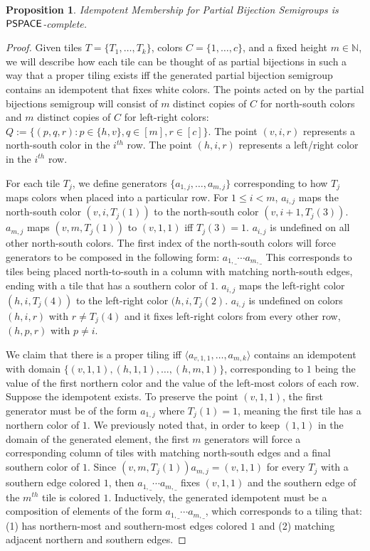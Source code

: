 \documentclass{amsart}
\newcommand{\PSPACE}{\ensuremath\mathsf{PSPACE}}
\newtheorem{proposition}[theorem]{Proposition}
\theoremstyle{remark}
\numberwithin{equation}{section}
\begin{document}
\begin{proposition} \label{idmemthm}
  Idempotent Membership for Partial Bijection Semigroups is $\PSPACE$-complete.
\end{proposition}
\begin{proof}
Given tiles $T = \{T_1,\dots,T_k\}$, colors $C = \{1,\dots,c\}$, and a fixed height $m \in \mathbb{N}$, we will describe how each tile can be thought of as partial bijections in such a way that a proper tiling exists iff the generated partial bijection semigroup contains an idempotent that fixes white colors. The points acted on by the partial bijections semigroup will consist of $m$ distinct copies of $C$ for north-south colors and $m$ distinct copies of $C$ for left-right colors: $Q := \{(p,q,r):p \in \{h,v\}, q \in [m],r \in [c]\}$. The point $(v,i,r)$ represents a north-south color in the $i^{th}$ row. The point $(h,i,r)$ represents a left/right color in the $i^{th}$ row.

For each tile $T_j$, we define generators $\{a_{1,j},\dots,a_{m,j}\}$ corresponding to how $T_j$ maps colors when placed into a particular row. For $1 \leq i < m$, $a_{i,j}$ maps the north-south color $(v,i,T_j(1))$ to the north-south color $(v,i+1,T_j(3))$. $a_{m,j}$ maps $(v,m,T_j(1))$ to $(v,1,1)$ iff $T_j(3)=1$. $a_{i,j}$ is undefined on all other north-south colors. The first index of the north-south colors will force generators to be composed in the following form: $a_{1,\_} \cdots a_{m,\_}$ This corresponds to tiles being placed north-to-south in a column with matching north-south edges, ending with a tile that has a southern color of $1$. $a_{i,j}$ maps the left-right color $(h,i,T_j(4))$ to the left-right color $(h,i,T_j(2)$. $a_{i,j}$ is undefined on colors $(h,i,r)$ with $r \neq T_j(4)$ and it fixes left-right colors from every other row, $(h,p,r)$ with $p \neq i$.

We claim that there is a proper tiling iff $\langle a_{v,1,1},\dots,a_{m,k}\rangle$ contains an idempotent with domain $\{(v,1,1),(h,1,1),\dots,(h,m,1)\}$, corresponding to $1$ being the value of the first northern color and the value of the left-most colors of each row. Suppose the idempotent exists. To preserve the point $(v,1,1)$, the first generator must be of the form $a_{1,j}$ where $T_j(1) = 1$, meaning the first tile has a northern color of $1$. We previously noted that, in order to keep $(1,1)$ in the domain of the generated element, the first $m$ generators will force a corresponding column of tiles with matching north-south edges and a final southern color of $1$. Since $(v,m,T_j(1))a_{m,j}=(v,1,1)$ for every $T_j$ with a southern edge colored $1$, then $a_{1,\_} \cdots a_{m,\_}$ fixes $(v,1,1)$ and the southern edge of the $m^{th}$ tile is colored $1$. Inductively, the generated idempotent must be a composition of elements of the form $a_{1,\_} \cdots a_{m,\_}$, which corresponds to a tiling that: (1) has northern-most and southern-most edges colored $1$ and (2) matching adjacent northern and southern edges.


\end{proof}
\end{document}
